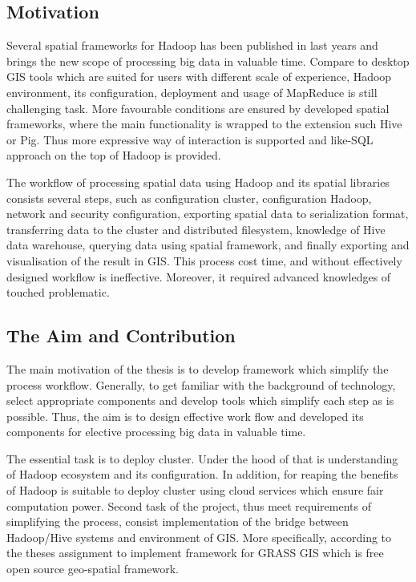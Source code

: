 \documentclass[a4paper,12pt,oneside]{report}
\begin{document}
	
	\subsection*{Motivation}
	Several spatial frameworks for Hadoop has been published in last years and
	brings the new 	
	scope of  processing big data in valuable time. Compare to  desktop GIS tools
	which are suited for users with different scale of experience, Hadoop
	environment, its configuration, deployment and usage of MapReduce is still
	challenging task. More favourable conditions are ensured by developed spatial
	frameworks, where the  main functionality is wrapped to the extension such Hive
	or Pig.  Thus more expressive way of interaction is supported and like-SQL
	approach on the top of Hadoop is provided. 
	
	The workflow of processing spatial data using  Hadoop and its spatial libraries
	consists several steps, such as configuration cluster, configuration Hadoop,
	network and security configuration, exporting spatial data to serialization
	format, transferring data to the cluster and distributed filesystem, knowledge
	of Hive data warehouse, querying data using spatial framework, and  finally
	exporting and visualisation of the result in GIS. This process cost time, and
	without effectively designed workflow is ineffective. Moreover, it required
	advanced knowledges of touched problematic. 
	
	\subsection*{The Aim and Contribution}
	The main motivation of the thesis is to develop framework which simplify the
	process workflow. Generally, to get familiar with the background of technology,
	select appropriate components and develop tools which simplify each step as is
	possible. Thus, the aim is to design effective work flow and developed its
	components for elective processing big data in valuable time.
	
	The essential task is to deploy cluster.  Under the hood of that is
	understanding of Hadoop ecosystem and its configuration. In addition, for
	reaping the benefits of Hadoop is suitable to deploy cluster using cloud
	services which ensure fair computation power.  Second task of the project, thus 
	meet requirements of simplifying the process, consist implementation of the
	bridge between Hadoop/Hive systems and environment of GIS. More specifically,
	according to the theses assignment to implement framework for GRASS GIS which is
	free open source geo-spatial framework.
	
\end{document}
